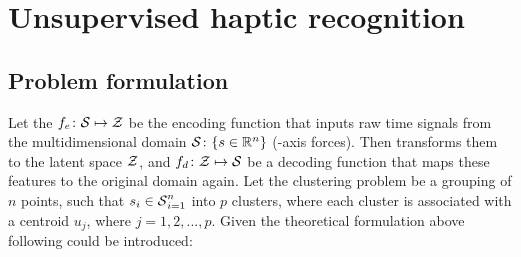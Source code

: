 \documentclass[a4paper, 10pt, twoside]{report}
\begin{document}
\section{Unsupervised haptic recognition}
\label{part:methods:materials:dec}

\subsection{Problem formulation}
\label{part:methods:materials:dec:problem}

Let the $f_e \colon {\cal S} \mapsto {\cal Z}$ be the encoding function that inputs raw time signals from the multidimensional domain ${\cal S} \colon \{s \in \mathbb{R}^n\}$ (-axis forces). Then transforms them to the latent space ${\cal Z}$, and $f_d \colon {\cal Z} \mapsto {\cal S}$ be a decoding function that maps these features to the original domain again. Let the clustering problem be a grouping of $n$ points, such that ${s_i \in {\cal S}}_{i=1}^{n}$ into $p$ clusters, where each cluster is associated with a centroid $u_j$, where $j = {1, 2, ..., p}$. Given the theoretical formulation above following could be introduced:
\end{document}
